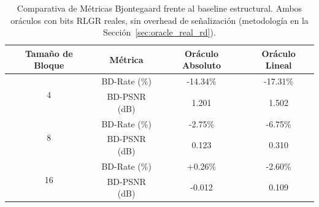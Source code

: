 \begin{table}[H]
\centering
\caption{Comparativa de Métricas Bjontegaard frente al baseline estructural. Ambos oráculos con
bits RLGR reales, sin overhead de señalización (metodología en la Sección~\ref{sec:oracle_real_rd}).}
\begin{tabular}{|c|c|c|c|}
\hline
\textbf{Tamaño de Bloque} & \textbf{Métrica} & \textbf{Oráculo Absoluto} & \textbf{Oráculo Lineal} \\
\hline
\multirow{2}{*}{4} & BD-Rate (\%) & -14.34\% & -17.31\% \\
                   & BD-PSNR (dB) & 1.201 & 1.502 \\
\hline
\multirow{2}{*}{8} & BD-Rate (\%) & -2.75\% & -6.75\% \\
                   & BD-PSNR (dB) & 0.123 & 0.310 \\
\hline
\multirow{2}{*}{16} & BD-Rate (\%) & +0.26\% & -2.60\% \\
                    & BD-PSNR (dB) & -0.012 & 0.109 \\
\hline
\end{tabular}
\label{tab:oracle_comparison}
\end{table}

